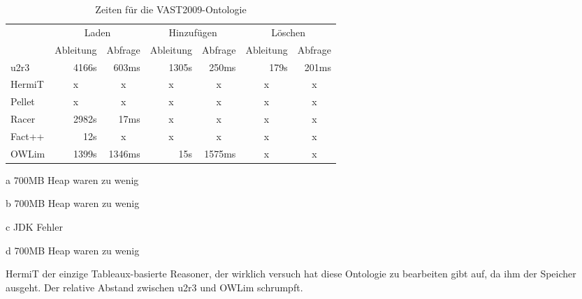 \begin{table}[htbp]
\caption{Zeiten für die VAST2009-Ontologie}
\label{table-time-vast2009}
\begin{center}
\begin{threeparttable}
\begin{tabular}{l|r|r|r|r|r|r|}
\cline{2-7}
 & \multicolumn{2}{|c|}{Laden} & \multicolumn{2}{|c|}{Hinzufügen} & \multicolumn{2}{|c|}{Löschen} \\
\cline{2-7}
 & \multicolumn{1}{|c|}{Ableitung} & \multicolumn{1}{|c|}{Abfrage} & \multicolumn{1}{|c|}{Ableitung} & \multicolumn{1}{|c|}{Abfrage} & \multicolumn{1}{|c|}{Ableitung} & \multicolumn{1}{|c|}{Abfrage} \\
\hline
\multicolumn{1}{|l|}{u2r3} & 4166s & 603ms & 1305s & 250ms & 179s & 201ms \\ \hline
\multicolumn{1}{|l|}{HermiT\tnote{a}} & \multicolumn{1}{c|}{x} & \multicolumn{1}{c|}{x} & \multicolumn{1}{c|}{x} & \multicolumn{1}{c|}{x} & \multicolumn{1}{c|}{x} & \multicolumn{1}{c|}{x} \\ \hline
\multicolumn{1}{|l|}{Pellet\tnote{b}} & \multicolumn{1}{c|}{x} & \multicolumn{1}{c|}{x} & \multicolumn{1}{c|}{x} & \multicolumn{1}{c|}{x} & \multicolumn{1}{c|}{x} & \multicolumn{1}{c|}{x} \\ \hline
\multicolumn{1}{|l|}{Racer\tnote{c}} & 2982s & 17ms & \multicolumn{1}{c|}{x} & \multicolumn{1}{c|}{x} & \multicolumn{1}{c|}{x} & \multicolumn{1}{c|}{x} \\ \hline
\multicolumn{1}{|l|}{Fact++\tnote{d}} & 12s & \multicolumn{1}{c|}{x} & \multicolumn{1}{c|}{x} & \multicolumn{1}{c|}{x} & \multicolumn{1}{c|}{x} & \multicolumn{1}{c|}{x} \\ \hline
\multicolumn{1}{|l|}{OWLim} & 1399s & 1346ms & 15s & 1575ms & \multicolumn{1}{c|}{x} & \multicolumn{1}{c|}{x} \\ \hline
\end{tabular}
\begin{tablenotes}
	\item[a] 700MB Heap waren zu wenig
	\item[b] 700MB Heap waren zu wenig
	\item[c] JDK Fehler
	\item[d] 700MB Heap waren zu wenig
\end{tablenotes}
\end{threeparttable}
\end{center}
\end{table}

HermiT der einzige Tableaux-basierte Reasoner, der wirklich versuch hat diese Ontologie zu bearbeiten gibt auf, da ihm der Speicher ausgeht. Der relative Abstand zwischen u2r3 und OWLim schrumpft.

